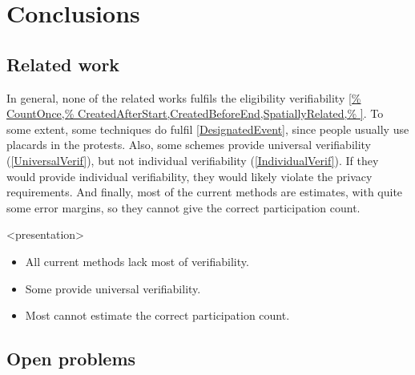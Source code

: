 \mode*
\section{Conclusions}

\subsection<presentation>{Related work}

In general, none of the related works fulfils the eligibility verifiability 
\cref{%
  CountOnce,%
  CreatedAfterStart,CreatedBeforeEnd,SpatiallyRelated,%
}.
To some extent, some techniques do fulfil \cref{DesignatedEvent}, since people 
usually use placards in the protests.
Also, some schemes provide universal verifiability (\cref{UniversalVerif}), but 
not individual verifiability (\cref{IndividualVerif}).
If they would provide individual verifiability, they would likely violate the 
privacy requirements.
And finally, most of the current methods are estimates, with quite some error 
margins, so they cannot give the correct participation count.

\begin{frame}<presentation>
  \begin{remark}
    \begin{itemize}
      \item All current methods lack most of verifiability.
      \item Some provide universal verifiability.

        \pause

      \item Most cannot estimate the correct participation count.
    \end{itemize}
  \end{remark}
\end{frame}

\subsection{Open problems}

